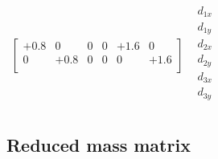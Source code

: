 \documentclass{article}
\begin{document}
\begin{math}
\begin{matrix}
\begin{bmatrix}
            +0.8& 0   & 0& 0&+1.6& 0  \\
             0  &+0.8 & 0& 0& 0  &+1.6\\
            \end{bmatrix}&
            \begin{matrix}
            d_{1x}\\
            d_{1y}\\
            d_{2x}\\
            d_{2y}\\
            d_{3x}\\
            d_{3y}\\
            \end{matrix}
        \end{matrix}
    \end{math}
\subsection{Reduced mass matrix}
\end{document}
